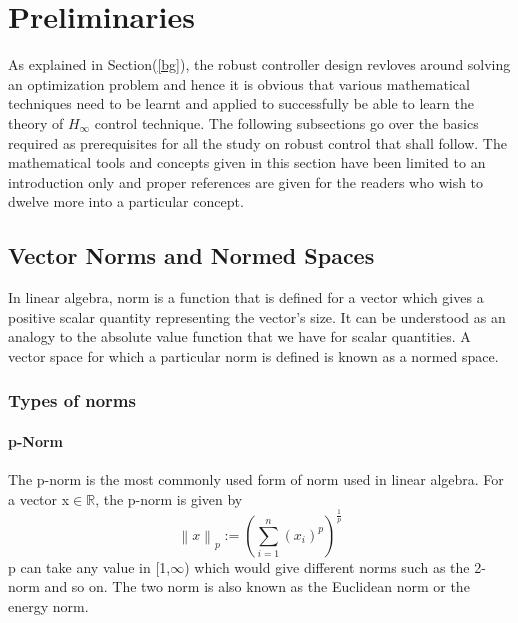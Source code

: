 \documentclass[a4paper,12pt]{article}
\newcommand\norm[1]{\left\lVert#1\right\rVert}
\begin{document}
\section{Preliminaries}

As explained in Section(\ref{bg}), the robust controller design revloves around solving an optimization problem and hence it is obvious that various mathematical techniques need to be learnt and applied to successfully be able to learn the theory of $H_{\infty}$ control technique. The following subsections go over the basics required as prerequisites for all the study on robust control that shall follow. The mathematical tools and concepts given in this section have been limited to an introduction only and proper references are given for the readers who wish to dwelve more into a particular concept. 
	\subsection{Vector Norms and Normed Spaces}
	In linear algebra, norm is a function that is defined for a vector which gives a positive scalar quantity representing the vector's size. It can be understood as an analogy to the absolute value function that we have for scalar quantities. A vector space for which  a particular norm is defined is known as a normed space. 
		\subsubsection{Types of norms}
			\paragraph{p-Norm}  The p-norm is the most commonly used form of norm used in linear algebra. For a vector x$\in \mathbb{R}$, the p-norm is given by
				\begin{equation}
					\norm{x}_{p} := \left(\sum\limits_{i=1}^n  (x_{i})^{p}\right)^{\frac{1}{p}}
				\end{equation}
				p can take any value in [1,$\infty$) which would give different norms such as the 2-norm and so on. The two norm is also known as the Euclidean norm or the energy norm.
				
\end{document}
